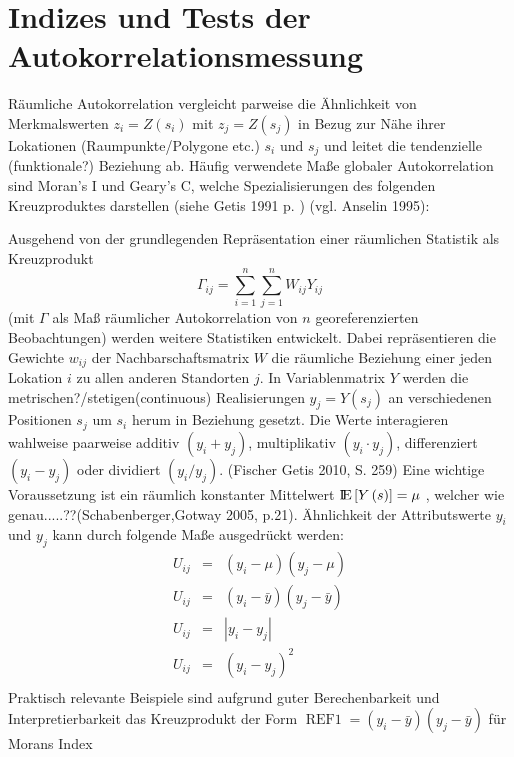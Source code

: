 \section{Indizes und Tests der Autokorrelationsmessung}
Räumliche Autokorrelation vergleicht parweise die Ähnlichkeit von Merkmalswerten 
$z_i=Z\left(s_i\right)$ mit $z_j=Z\left(s_j\right)$ 
in Bezug zur Nähe ihrer Lokationen (Raumpunkte/Polygone etc.) $s_i$ und $s_j$ und leitet die tendenzielle 
(funktionale?) Beziehung ab. 
Häufig verwendete Maße globaler Autokorrelation sind Moran’s I und Geary’s C, welche Spezialisierungen des folgenden 
Kreuzproduktes darstellen (siehe Getis 1991 p.  ) (vgl. Anselin 1995):

Ausgehend von der grundlegenden Repräsentation einer räumlichen Statistik als Kreuzprodukt 
\begin{equation}
    \Gamma_{ij} =\sum_{i=1}^n \sum_{j=1}^n W_{ij} Y_{ij}
\end{equation}
(mit $\Gamma$ als Maß räumlicher Autokorrelation von $n$ georeferenzierten Beobachtungen) werden weitere Statistiken entwickelt. 
Dabei repräsentieren die Gewichte $w_{ij}$ der Nachbarschaftsmatrix $W$ die räumliche Beziehung einer 
jeden Lokation $i$ zu allen anderen Standorten $j$. 
In Variablenmatrix $Y$ werden die metrischen?/stetigen(continuous) Realisierungen $y_j=Y\left( s_j \right) $
an verschiedenen Positionen $s_j$ um $s_i$ herum in Beziehung gesetzt. 
Die Werte interagieren wahlweise paarweise additiv $\left(y_i+y_j\right)$, multiplikativ $\left(y_i \cdot y_j\right)$, 
differenziert $\left(y_i-y_j\right)$ oder dividiert $\left(y_i / y_j\right)$. (Fischer Getis 2010, S. 259)
Eine wichtige Voraussetzung ist ein räumlich konstanter Mittelwert $ {\rm I\!E}\left[Y\left(s\right)\right]=\mu$ ,
welcher wie genau.....??(Schabenberger,Gotway 2005, p.21). 
Ähnlichkeit der Attributswerte $y_i$ und $y_j$ kann durch folgende Maße ausgedrückt werden:
\begin{eqnarray}
    U_{ij} & = &\left (y_i - \mu \right) \left( y_j-\mu \right) \\
    U_{ij} & = &\left( y_i-\bar{y} \right) \left( y_j-\bar{y} \right) \\
    U_{ij} & = &\left| y_i-y_j \right| \\
    U_{ij} & = &\left( y_i-y_j \right)^2 \\
\end{eqnarray}
Praktisch relevante Beispiele sind aufgrund guter Berechenbarkeit und Interpretierbarkeit 
das Kreuzprodukt der Form $\operatorname{REF1}=\left( y_i-\bar{y} \right) \left( y_j-\bar{y} \right)$ für Morans Index 

